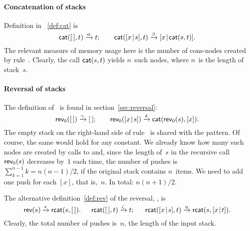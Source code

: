 \paragraph{Concatenation of stacks}

Definition in \fig~\vref{def:cat} is
\begin{equation*}
\textsf{cat}(        [\,],t) \xrightarrow{\smash{\alpha}} t;\qquad
\textsf{cat}([{x}\!\mid\!{s}],t) \xrightarrow{\smash{\beta}}
                                 [{x}\!\mid\!{\textsf{cat}(s,t)}].
\end{equation*}
The relevant measure of memory usage here is the number of cons\hyp{}nodes created by rule~\clause{\beta}. Clearly, the call \(\textsf{cat}(s,t)\) yields \(n\)~such nodes, where \(n\)~is the length of stack~\(s\).

\paragraph{Reversal of stacks}

The definition of~ is found in
section~\ref{sec:reversal}:
\begin{equation*}
\textsf{rev}_0([\,]) \xrightarrow{\smash{\gamma}} [\,];\qquad
\textsf{rev}_0([{x}\!\mid\!{s}]) \xrightarrow{\smash{\delta}}
                         \textsf{cat}(\textsf{rev}_0(s),[x]).
\end{equation*}
The empty stack on the right\hyp{}hand side of rule~\clause{\gamma} is
shared with the pattern. Of course, the same would hold for any
constant. We already know how many such nodes are created by calls to
 and, since the length of~\(s\) in the recursive call
\(\textsf{rev}_0(s)\) decreases by~\(1\) each time, the number of pushes
is \(\sum_{k=1}^{n-1}k = n(n-1)/2\), if the original stack
contains \(n\)~items. We need to add one push for each \([x]\), that
is,~\(n\). In total: \(n(n+1)/2\).

The alternative definition~\eqref{def:rev} of the reversal,
, is
\begin{equation*}
\textsf{rev}(s) \xrightarrow{\smash{\epsilon}} \textsf{rcat}(s,[\,]).\quad\;\;
\textsf{rcat}([\,],t) \xrightarrow{\smash{\zeta}} t;\quad\;\;
\textsf{rcat}([{x}\!\mid\!{s}],t) \xrightarrow{\smash{\eta}}
                          \textsf{rcat}(s,[{x}\!\mid\!{t}]).
\end{equation*}
Clearly, the total number of pushes is~\(n\), the length of the input
stack.


